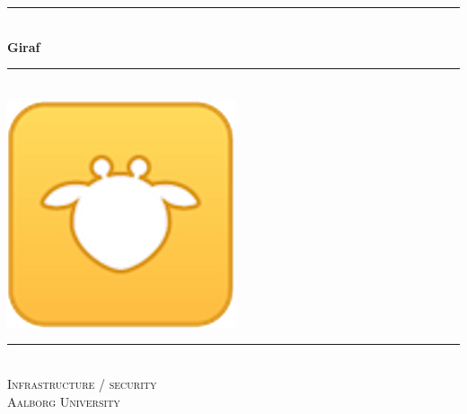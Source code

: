 \begin{titlingpage}

  \centering
  \rule{\linewidth}{0.2 mm} \\[0.5 cm]
  { \huge \bfseries Giraf}\\
  \rule{\linewidth}{0.2 mm} \\[2 cm]
  \includegraphics[scale=0.70]{images/giraf_logo.png}\\[2 cm]
  \rule{\linewidth}{0.2 mm} \\[0.3 cm]
  \textsc{\LARGE Infrastructure / security} \\[0.5 cm]
  \textsc{\large Aalborg University}\\[0.5 cm]
  {\Large \groupnumber}\\[0.5 cm]

\end{titlingpage}
